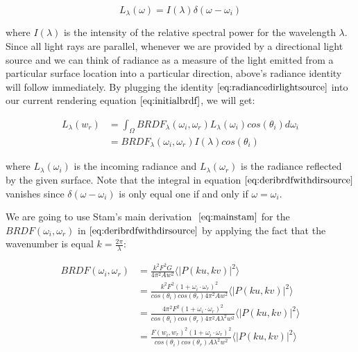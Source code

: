 \begin{equation}
 L_{\lambda}(\omega)=I(\lambda)\delta(\omega-\omega_i)
\label{eq:radiancedirlightsource}
\end{equation}

where $I(\lambda)$ is the intensity of the relative spectral power for the wavelength $\lambda$. 
Since all light rays are parallel, whenever we are provided by a directional light source and we can think of radiance as a measure of the light emitted from a particular surface location into a particular direction, above's radiance identity will follow immediately. By plugging the identity $\ref{eq:radiancedirlightsource}$ into our current rendering equation $\ref{eq:initialbrdf}$, we will get:

\begin{align}
L_{\lambda}(w_r) 
& = \int_{\Omega} BRDF_{\lambda}(\omega_i, \omega_r) L_{\lambda}(\omega_i) cos(\theta_i) d\omega_i \nonumber \\
& = BRDF_{\lambda}(\omega_i, \omega_r) I(\lambda) cos(\theta_i)
\label{eq:deribrdfwithdirsource}
\end{align}

where $L_{\lambda}(\omega_i)$ is the incoming radiance and $L_{\lambda}(\omega_r)$ is the radiance reflected by the given surface. Note that the integral in equation $\ref{eq:deribrdfwithdirsource}$ vanishes since $\delta(\omega-\omega_i)$ is only equal one if and only if $\omega = \omega_i$.

We are going to use Stam's main derivation $~\eqref{eq:mainstam}$ for the $BRDF(\omega_i, \omega_r)$ in $\ref{eq:deribrdfwithdirsource}$ by applying the fact that the wavenumber is equal $k=\frac{2\pi}{\lambda}$:

\begin{align}
BRDF(\omega_i, \omega_r) 
& = \frac{k^2 F^2 G}{4\pi^2 A w^2} \langle \left|P(ku, kv) \right|^2\rangle \nonumber\\
& = \frac{k^2 F^2 (1 + \omega_i \cdot \omega_r)^2}{cos(\theta_i)cos(\theta_r) 4\pi^2 A w^2} \langle \left|P(ku, kv)  \right|^2\rangle \nonumber\\
& = \frac{4 \pi^2 F^2 (1 + \omega_i \cdot \omega_r)^2}{cos(\theta_i)cos(\theta_r) 4\pi^2 A \lambda^2 w^2} \langle \left|P(ku, kv)  \right|^2\rangle \nonumber\\
& = \frac{F(w_i, w_r)^2 (1 + \omega_i \cdot \omega_r)^2}{cos(\theta_i)cos(\theta_r) A \lambda^2 w^2} \langle \left|P(ku, kv)  \right|^2\rangle
\end{align}

